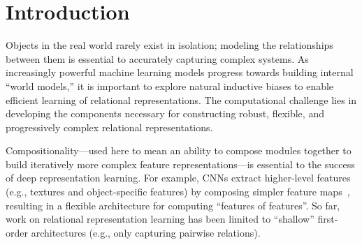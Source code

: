 \section{Introduction}\label{sec:intro}

Objects in the real world rarely exist in isolation; 
modeling the relationships between them is essential to accurately capturing complex systems. As increasingly powerful machine learning models progress towards building internal ``world models,'' it is important to explore natural inductive biases to enable efficient learning of relational representations. The computational challenge lies in developing the components necessary for constructing robust, flexible, and progressively complex relational representations.


Compositionality---used here to mean an ability to compose modules together to build iteratively more complex feature representations---is essential to the success of deep representation learning. 
For example, CNNs extract higher-level features (e.g., textures and object-specific features) by composing simpler feature maps~\citep{zeiler2014visualizing}, resulting in a flexible architecture for computing ``features of features''.
So far, work on relational representation learning has been limited to ``shallow'' first-order architectures (e.g., only capturing pairwise relations).

